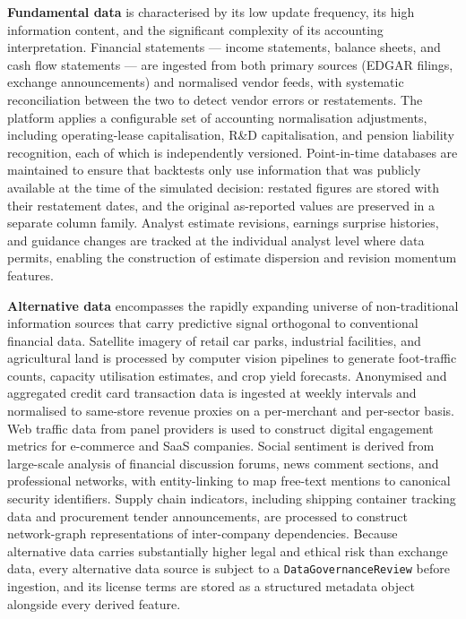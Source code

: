 \documentclass[12pt,openany]{book}
\numberwithin{equation}{chapter}
\theoremstyle{plain}
\theoremstyle{definition}
\theoremstyle{remark}
\begin{document}
\textbf{Fundamental data} is characterised by its low update frequency, its high information content, and the significant complexity of its accounting interpretation. Financial statements --- income statements, balance sheets, and cash flow statements --- are ingested from both primary sources (EDGAR filings, exchange announcements) and normalised vendor feeds, with systematic reconciliation between the two to detect vendor errors or restatements. The platform applies a configurable set of accounting normalisation adjustments, including operating-lease capitalisation, R\&D capitalisation, and pension liability recognition, each of which is independently versioned. Point-in-time databases are maintained to ensure that backtests only use information that was publicly available at the time of the simulated decision: restated figures are stored with their restatement dates, and the original as-reported values are preserved in a separate column family. Analyst estimate revisions, earnings surprise histories, and guidance changes are tracked at the individual analyst level where data permits, enabling the construction of estimate dispersion and revision momentum features.

\textbf{Alternative data} encompasses the rapidly expanding universe of non-traditional information sources that carry predictive signal orthogonal to conventional financial data. Satellite imagery of retail car parks, industrial facilities, and agricultural land is processed by computer vision pipelines to generate foot-traffic counts, capacity utilisation estimates, and crop yield forecasts. Anonymised and aggregated credit card transaction data is ingested at weekly intervals and normalised to same-store revenue proxies on a per-merchant and per-sector basis. Web traffic data from panel providers is used to construct digital engagement metrics for e-commerce and SaaS companies. Social sentiment is derived from large-scale analysis of financial discussion forums, news comment sections, and professional networks, with entity-linking to map free-text mentions to canonical security identifiers. Supply chain indicators, including shipping container tracking data and procurement tender announcements, are processed to construct network-graph representations of inter-company dependencies. Because alternative data carries substantially higher legal and ethical risk than exchange data, every alternative data source is subject to a \texttt{DataGovernanceReview} before ingestion, and its license terms are stored as a structured metadata object alongside every derived feature.
\end{document}
